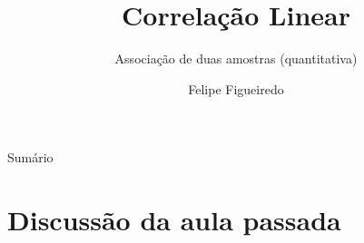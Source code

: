 \documentclass{beamer}
\title%
{Correlação Linear}
\subtitle
{Associação de duas amostras (quantitativa)} %
\author%
{Felipe Figueiredo}%
\institute[INTO] %
{Instituto Nacional de Traumatologia e Ortopedia
}
\date%
{}
\begin{document}
\begin{frame}
  \titlepage
\end{frame}

\begin{frame}{Sumário}
  \tableofcontents
\end{frame}








\section{Discussão da aula passada}
\end{document}
